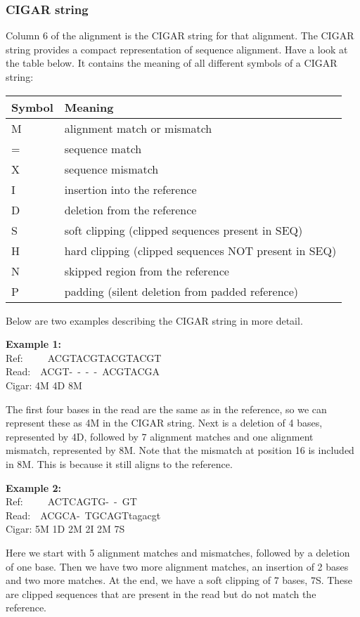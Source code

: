 \documentclass[11pt]{article}
\begin{document}
    \hypertarget{cigar-string}{%
\subsubsection{CIGAR string}\label{cigar-string}}

Column 6 of the alignment is the CIGAR string for that alignment. The
CIGAR string provides a compact representation of sequence alignment.
Have a look at the table below. It contains the meaning of all different
symbols of a CIGAR string:

\begin{longtable}[]{@{}ll@{}}
\toprule
Symbol & Meaning \\
\midrule
\endhead
M & alignment match or mismatch \\
= & sequence match \\
X & sequence mismatch \\
I & insertion into the reference \\
D & deletion from the reference \\
S & soft clipping (clipped sequences present in SEQ) \\
H & hard clipping (clipped sequences NOT present in SEQ) \\
N & skipped region from the reference \\
P & padding (silent deletion from padded reference) \\
\bottomrule
\end{longtable}

Below are two examples describing the CIGAR string in more detail.

\textbf{Example 1:}\\
Ref:~~~~~ACGTACGTACGTACGT\\
Read:~~ACGT-~-~-~-~ACGTACGA\\
Cigar: 4M 4D 8M

The first four bases in the read are the same as in the reference, so we
can represent these as 4M in the CIGAR string. Next is a deletion of 4
bases, represented by 4D, followed by 7 alignment matches and one
alignment mismatch, represented by 8M. Note that the mismatch at
position 16 is included in 8M. This is because it still aligns to the
reference.

\textbf{Example 2:}\\
Ref:~~~~~ACTCAGTG-~-~GT\\
Read:~~ACGCA-~TGCAGTtagacgt\\
Cigar: 5M 1D 2M 2I 2M 7S

Here we start with 5 alignment matches and mismatches, followed by a
deletion of one base. Then we have two more alignment matches, an
insertion of 2 bases and two more matches. At the end, we have a soft
clipping of 7 bases, 7S. These are clipped sequences that are present in
the read but do not match the reference.
\end{document}
